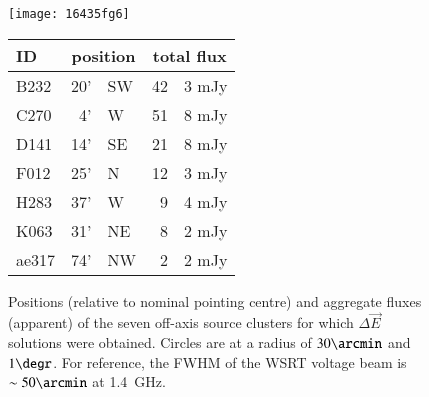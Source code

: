 \documentclass{aa}
\newcommand{\jones}[2]{\vec {#1}_{#2}}
\begin{document}
\begin{figure}
\begin{minipage}[c]{.45\columnwidth}
\texttt{[image: 16435fg6]}
\end{minipage}\hfill\begin{minipage}[c]{.5\columnwidth}
\begin{tabular}{lr@{ }lr@{.}l}
\hline
\hline
ID & \multicolumn{2}{c}{position} & \multicolumn{2}{c}{total flux} \\
\hline
B232  & 20' & SW & 42 & 3 mJy\\
C270  &  4' & W  & 51 & 8 mJy\\
D141  & 14' & SE & 21 & 8 mJy\\
F012  & 25' & N  & 12 & 3 mJy \\
H283  & 37' & W  &  9 & 4 mJy \\
K063  & 31' & NE &  8 & 2 mJy \\
ae317 & 74' & NW &  2 & 2 mJy \\
\hline
\end{tabular}
\end{minipage}

\caption{\label{fig:source-plot}Positions (relative to nominal pointing centre) and aggregate fluxes (apparent) of the seven off-axis source clusters for which $\Delta\jones{E}{}$ solutions were obtained. Circles are at a radius of $30\arcmin$ and $1\degr$. For reference, the FWHM of the WSRT voltage beam is $\sim50\arcmin$ at 1.4~GHz.}
\end{figure}
\end{document}
